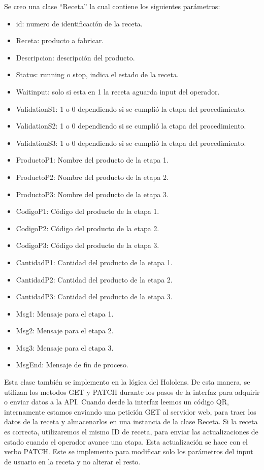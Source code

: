 Se creo una clase ``Receta'' la cual contiene los siguientes parámetros:

\begin{itemize}
\item id: numero de identificación de la receta.
\item Receta: producto a fabricar.
\item Descripcion: descripción del producto.
\item Status: running o stop, indica el estado de la receta.
\item Waitinput: solo si esta en 1 la receta aguarda input del operador.
\item ValidationS1: 1 o 0 dependiendo si se cumplió la etapa del procedimiento.
\item ValidationS2: 1 o 0 dependiendo si se cumplió la etapa del procedimiento.
\item ValidationS3: 1 o 0 dependiendo si se cumplió la etapa del procedimiento.
\item ProductoP1: Nombre del producto de la etapa 1.
\item ProductoP2: Nombre del producto de la etapa 2.
\item ProductoP3: Nombre del producto de la etapa 3.
\item CodigoP1: Código del producto de la etapa 1.
\item CodigoP2: Código del producto de la etapa 2.
\item CodigoP3: Código del producto de la etapa 3.
\item CantidadP1: Cantidad del producto de la etapa 1.
\item CantidadP2: Cantidad del producto de la etapa 2.
\item CantidadP3: Cantidad del producto de la etapa 3.
\item Msg1: Mensaje para el etapa 1.
\item Msg2: Mensaje para el etapa 2.
\item Msg3: Mensaje para el etapa 3.
\item MsgEnd: Mensaje de fin de proceso.
\end{itemize}

Esta clase también se implemento en la lógica del Hololens. De esta manera, se utilizan los metodos GET y PATCH durante los pasos de la interfaz para adquirir o enviar datos a la API. Cuando desde la interfaz leemos un código QR, internamente estamos enviando una petición GET al servidor web, para traer los datos de la receta y almacenarlos en una instancia de la clase Receta. Si la receta es correcta, utilizaremos el mismo ID de receta, para enviar las actualizaciones de estado cuando el operador avance una etapa. Esta actualización se hace con el verbo PATCH. Este se implemento para modificar solo los parámetros del input de usuario en la receta y no alterar el resto. 

